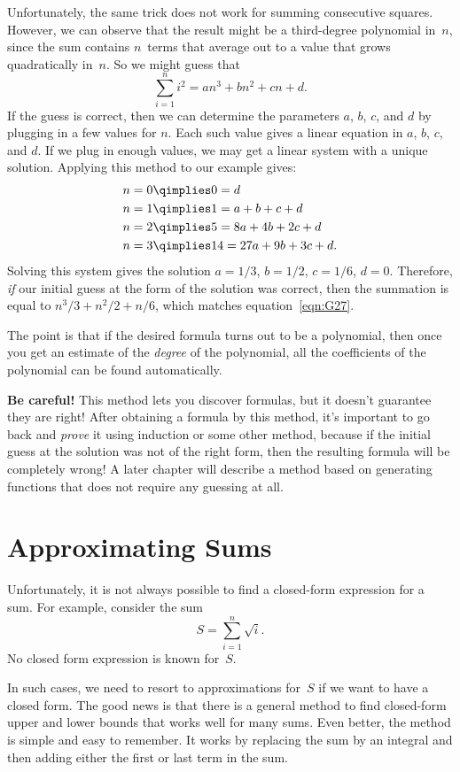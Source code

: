 Unfortunately, the same trick does not work for summing consecutive
squares.  However, we can observe that the result might be a
third-degree polynomial in~$n$, since the sum contains $n$~terms that
average out to a value that grows quadratically in~$n$.  So we might
guess that
\[
    \sum_{i=1}^n i^2 = an^3 + bn^2 + cn + d.
\]
If the guess is correct, then we can determine the parameters $a$,
$b$, $c$, and $d$ by plugging in a few values for $n$.  Each such
value gives a linear equation in $a$, $b$, $c$, and $d$.  If we plug
in enough values, we may get a linear system with a unique solution.
Applying this method to our example gives:
\begin{align*}
n = 0 & \qimplies  0 = d \\
n = 1 & \qimplies  1 = a + b + c + d \\
n = 2 & \qimplies  5 = 8a + 4b + 2c + d \\
n = 3 & \qimplies  14 = 27a + 9b + 3c + d.
\end{align*}
Solving this system gives the solution $a = 1/3$, $b = 1/2$, $c =
1/6$, $d = 0$.  Therefore, \emph{if} our initial guess at the form of
the solution was correct, then the summation is equal to $n^3/3 +
n^2/2 + n/6$, which matches equation~\ref{eqn:G27}.

The point is that if the desired formula turns out to be a polynomial,
then once you get an estimate of the \emph{degree} of the polynomial,
all the coefficients of the polynomial can be found automatically.

\textbf{Be careful!}  This method lets you discover formulas, but it
doesn't guarantee they are right!  After obtaining a formula by this
method, it's important to go back and \emph{prove} it using induction
or some other method, because if the initial guess at the solution was
not of the right form, then the resulting formula will be completely
wrong!  A later chapter will describe
a method based on generating functions that does not require any
guessing at all.


\section{Approximating Sums}

Unfortunately, it is not always possible to find a closed-form
expression for a sum.  For example, consider the sum
\[
    S = \sum_{i = 1}^n \sqrt{i}.
\]
No closed form expression is known for~$S$.

In such cases, we need to resort to approximations for~$S$ if we want
to have a closed form.  The good news is that there is a general
method to find closed-form upper and lower bounds that works well for
many sums.  Even better, the method is simple and easy to remember.
It works by replacing the sum by an integral and then adding either
the first or last term in the sum.

